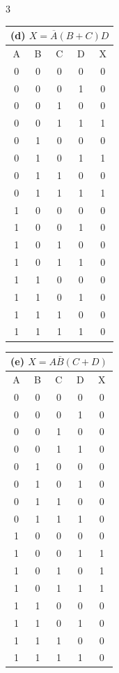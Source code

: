 \documentclass[a4paper]{article}
\begin{document}
\begin{multicols}{3}
\begin{tabular}{|c|c|c|c||c|}
\multicolumn{5}{|c|}{(d) $X = \overline{A}(B + C)D$} \\ \hline
A & B & C & D & X \\ \hline
0 & 0 & 0 & 0 & 0 \\ \hline
0 & 0 & 0 & 1 & 0 \\ \hline
0 & 0 & 1 & 0 & 0 \\ \hline
0 & 0 & 1 & 1 & 1 \\ \hline
0 & 1 & 0 & 0 & 0 \\ \hline
0 & 1 & 0 & 1 & 1 \\ \hline
0 & 1 & 1 & 0 & 0 \\ \hline
0 & 1 & 1 & 1 & 1 \\ \hline
1 & 0 & 0 & 0 & 0 \\ \hline
1 & 0 & 0 & 1 & 0 \\ \hline
1 & 0 & 1 & 0 & 0 \\ \hline
1 & 0 & 1 & 1 & 0 \\ \hline
1 & 1 & 0 & 0 & 0 \\ \hline
1 & 1 & 0 & 1 & 0 \\ \hline
1 & 1 & 1 & 0 & 0 \\ \hline
1 & 1 & 1 & 1 & 0 \\ \hline
\end{tabular}

\begin{tabular}{|c|c|c|c||c|}
\multicolumn{5}{|c|}{(e) $X = A\overline{B}(C + D)$} \\ \hline
A & B & C & D & X \\ \hline
0 & 0 & 0 & 0 & 0 \\ \hline
0 & 0 & 0 & 1 & 0 \\ \hline
0 & 0 & 1 & 0 & 0 \\ \hline
0 & 0 & 1 & 1 & 0 \\ \hline
0 & 1 & 0 & 0 & 0 \\ \hline
0 & 1 & 0 & 1 & 0 \\ \hline
0 & 1 & 1 & 0 & 0 \\ \hline
0 & 1 & 1 & 1 & 0 \\ \hline
1 & 0 & 0 & 0 & 0 \\ \hline
1 & 0 & 0 & 1 & 1 \\ \hline
1 & 0 & 1 & 0 & 1 \\ \hline
1 & 0 & 1 & 1 & 1 \\ \hline
1 & 1 & 0 & 0 & 0 \\ \hline
1 & 1 & 0 & 1 & 0 \\ \hline
1 & 1 & 1 & 0 & 0 \\ \hline
1 & 1 & 1 & 1 & 0 \\ \hline
\end{tabular}


\end{multicols}
\end{document}
